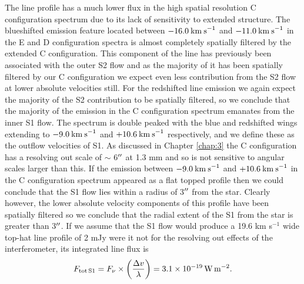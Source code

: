 The line profile has a much lower flux in the high spatial resolution C configuration spectrum due to its lack of sensitivity to extended structure. The blueshifted emission feature located between $-16.0\>{\rm km\>s}^{-1}$ and $-11.0\>{\rm km\>s}^{-1}$ in the E and D configuration spectra is almost completely spatially filtered by the extended C configuration. This component of the line has previously been associated with the outer S2 flow \citep{huggins_1987} and as the majority of it has been spatially filtered by our C configuration we expect even less contribution from the S2 flow at lower absolute velocities still. For the redshifted line emission we again expect the majority of the S2 contribution to be spatially filtered, so we conclude that the majority of the emission in the C configuration spectrum emanates from the inner S1 flow. The spectrum is double peaked with the blue and redshifted wings extending to $-9.0\>{\rm km\>s}^{-1}$ and $+10.6\>{\rm km\>s}^{-1}$ respectively, and we define these as the outflow velocities of S1. As discussed in Chapter \ref{chap:3} the C configuration has a resolving out scale of $\sim$ 6$^{\prime\prime}$ at 1.3 mm and so is not sensitive to angular scales larger than this. If the emission between $-9.0\>{\rm km\>s}^{-1}$ and $+10.6\>{\rm km\>s}^{-1}$ in the C configuration spectrum appeared as a flat topped profile then we could conclude that the S1 flow lies within a radius of 3$^{\prime\prime}$ from the star. Clearly however, the lower absolute velocity components of this profile have been spatially filtered so we conclude that the radial extent of the S1 from the star is greater than 3$^{\prime\prime}$. If we assume that the S1 flow would produce a 19.6 km s$^{-1}$ wide top-hat line profile of 2 mJy were it not for the resolving out effects of the interferometer, its integrated line flux is
\begin{equation}
F_{\rm{tot\,S1}}=F_{\nu}\times \left(\frac{\Delta v}{\lambda}\right)= 3.1 \times 10{}^{-19}\,\rm{W\,m}{}^{-2}.
\label{eq:5.1}
\end{equation}


